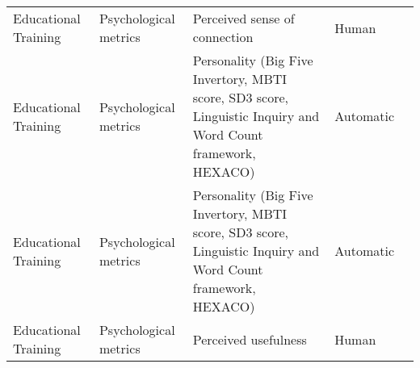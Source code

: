 \begin{small}
\begin{center}
\begin{longtable}{@{}p{}p{}p{}p{}p{}@{}}
Educational Training     & Psychological metrics & Perceived sense of connection                                                                                                                                                                               & Human     & \cite{Cheng2024LLMPoweredAT}                                                                                                                                                                                                                                                                                                                                                                                               \\
Educational Training     & Psychological metrics & Personality (Big Five Invertory, MBTI score, SD3 score, Linguistic Inquiry and Word Count framework, HEXACO)                                                                                                & Automatic & \cite{Sonlu2024TheEO}                                                                                                                                                                                                                                                                                                                                                                                                   \\
Educational Training     & Psychological metrics & Personality (Big Five Invertory, MBTI score, SD3 score, Linguistic Inquiry and Word Count framework, HEXACO)                                                                                                & Automatic & \cite{Liu2024PersonalityawareSS}                                                                                                                                                                                                                                                                                                                                                                                                 \\
Educational Training     & Psychological metrics & Perceived usefulness                                                                                                                                                                                        & Human     & \cite{Cheng2024LLMPoweredAT}                                                                                                                                                                                                                                                                                                                                                                                               \\

\end{longtable}
\end{center}
\end{small}
